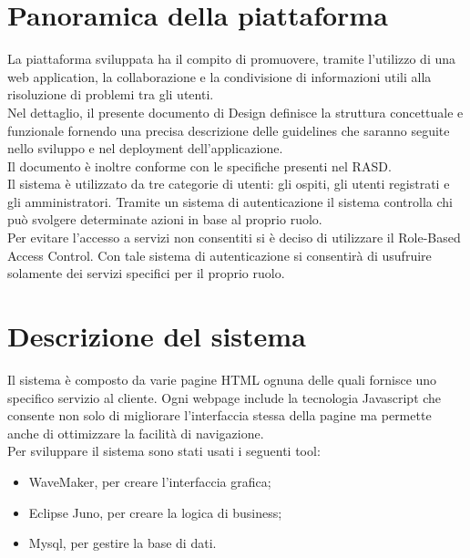 \documentclass[a4paper,12pt]{article}
\begin{document}
	    \vspace*{\fill}
	\tableofcontents
	    \vspace*{\fill}

\clearpage

\section{Panoramica della piattaforma}
La piattaforma sviluppata ha il compito di promuovere, tramite l’utilizzo di una web application, la collaborazione e la condivisione di informazioni utili alla risoluzione di problemi tra gli utenti.\\[1\baselineskip]Nel dettaglio, il presente documento di Design definisce la struttura concettuale e funzionale fornendo una precisa descrizione delle guidelines che saranno seguite nello sviluppo e nel deployment dell’applicazione.\\[1\baselineskip]Il documento è inoltre conforme con le specifiche presenti nel RASD.\\[1\baselineskip]Il sistema è utilizzato da tre categorie di utenti: gli ospiti, gli utenti registrati e gli amministratori. Tramite un sistema di autenticazione il sistema controlla chi può svolgere determinate azioni in base al proprio ruolo.\\[1\baselineskip]Per evitare l’accesso a servizi non consentiti si è deciso di utilizzare il Role-Based Access Control. Con tale sistema di autenticazione si consentirà di usufruire solamente dei servizi specifici per il proprio ruolo.

\section{Descrizione del sistema}
Il sistema è composto da varie pagine HTML ognuna delle quali fornisce uno specifico servizio al cliente. Ogni webpage include la tecnologia Javascript che consente non solo di migliorare l’interfaccia stessa della pagine ma permette anche di ottimizzare la facilità di navigazione.\\[1\baselineskip]Per sviluppare il sistema sono stati usati i seguenti tool:
\begin{itemize}
\item WaveMaker, per creare l’interfaccia grafica;
\item Eclipse Juno, per creare la logica di business;
\item Mysql, per gestire la base di dati.
\end{itemize}
\end{document}
